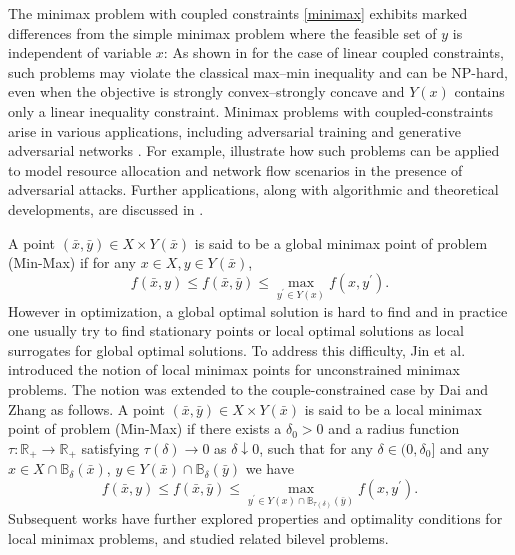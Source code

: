 \documentclass[11pt]{article}
\numberwithin{equation}{section}
\begin{document}
The minimax problem with  coupled constraints \eqref{minimax} exhibits marked differences from the simple minimax problem where the feasible set {of $y$} is independent of variable $x$:
As shown in \cite{Tsaknakis2021} for the case of linear coupled constraints, such problems may violate the classical max–min inequality and can be NP-hard, even when the objective is strongly convex–strongly concave and $Y(x)$ contains only a linear inequality constraint. Minimax problems with  coupled-constraints arise in various applications, including adversarial training \cite{Aleksander18,Tsaknakis2021} and generative adversarial networks \cite{Gauthier2019,Ian2014}. For example, \cite{LuMei2023,Tsaknakis2021} illustrate how such problems can be applied to model resource allocation and network flow scenarios in the presence of adversarial attacks. Further applications, along with algorithmic and theoretical developments, are discussed in \cite{DaiWa2022,DaiZh-2020,DaiZh-2022,Goktas2022,Goktas2023,GoktasZhao2022,LuMei2023,Tsaknakis2021,ZhangWang2022}.

A point $(\bar x,\bar y) \in X\times Y(\bar x)$  is said to be a global minimax point  of problem (Min-Max) if for any $x \in X, y\in  Y(\bar x)$,
$$f(\bar x, y) \leq f(\bar x,\bar y) \leq \max _{y^{\prime} \in Y(x)} f(x, y^{\prime}).$$
However in optimization,  a global optimal solution is hard to find and in practice one usually try to find stationary points or local optimal solutions as local surrogates for global optimal solutions. 
To address this difficulty, Jin et al. \cite{JNJ20}  introduced the notion of local minimax points for unconstrained minimax problems.  The notion was extended to the  couple-constrained case by Dai and Zhang \cite{DaiZh-2020} as follows.  A
  point $(\bar x,\bar y) \in X\times Y(\bar x)$  is said to be a local minimax point  of problem (Min-Max) if there exists a $\delta_0>0 $ and a radius function $\tau:\mathbb{R}_+\rightarrow \mathbb{R}_+$ satisfying $\tau (\delta) \rightarrow 0$ as $\delta \downarrow 0$, such that for any $\delta\in (0,\delta_0]$ and any $x\in X \cap \mathbb{B}_\delta(\bar x)$, $y\in Y( \bar x) \cap \mathbb{B}_\delta(\bar y)$ we have
$$f(\bar x, y) \leq f(\bar x,\bar y) \leq \max _{y^{\prime} \in Y(x)\cap \mathbb{B}_{\tau(\delta)}(\bar y)} f(x, y^{\prime}).$$Subsequent works \cite{DaiZh-2020, JC22, JNJ20, Zhang2022} have further explored properties and optimality conditions for local minimax problems, and \cite{Xu2023} studied related bilevel problems.
\end{document}
